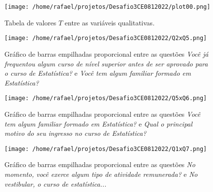 \documentclass[
        a4paper,
        11pt,
        extrafontsizes,
        oneside,
        onecolumn,
        openright,
        final,
        article,
        brazil,
        sumario=tradicional
]{abntex2}
\begin{document}


\begin{figure}[htp]
\centering
\texttt{[image: /home/rafael/projetos/Desafio3CE0812022/plot00.png]}
\caption{Tabela de valores $T$ entre as variáveis qualitativas. }
\label{tabela}
\end{figure}

\begin{figure}[htp]
\centering
\texttt{[image: /home/rafael/projetos/Desafio3CE0812022/Q2xQ5.png]}
\caption{Gráfico de barras empilhadas proporcional entre as questões \emph{Você já frequentou algum curso de nível superior antes de ser aprovado para o curso de Estatística?} e \emph{Você tem algum familiar formado em Estatística?}}
\label{Q2xQ5}
\end{figure}

\begin{figure}[htp]
\centering
\texttt{[image: /home/rafael/projetos/Desafio3CE0812022/Q5xQ6.png]}
\caption{Gráfico de barras empilhadas proporcional entre as questões \emph{Você tem algum familiar formado em Estatística?} e \emph{Qual o principal motivo do seu ingresso no curso de Estatística?}}
\label{Q5xQ6}
\end{figure}

\begin{figure}[htp]
\centering
\texttt{[image: /home/rafael/projetos/Desafio3CE0812022/Q1xQ7.png]}
\caption{Gráfico de barras empilhadas proporcional entre as questões \emph{No momento, você exerce algum tipo de atividade remunerada?} e \emph{No vestibular, o curso de estatística...}}
\label{Q1xQ7}
\end{figure}
\end{document}
